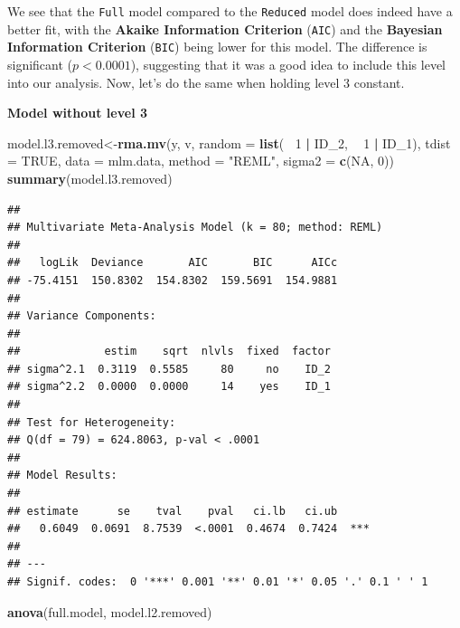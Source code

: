 \documentclass[]{book}
\newenvironment{Shaded}{\begin{snugshade}}{\end{snugshade}}
\newcommand{\DataTypeTok}[1]{\textcolor[rgb]{0.13,0.29,0.53}{#1}}
\newcommand{\DecValTok}[1]{\textcolor[rgb]{0.00,0.00,0.81}{#1}}
\newcommand{\KeywordTok}[1]{\textcolor[rgb]{0.13,0.29,0.53}{\textbf{#1}}}
\newcommand{\NormalTok}[1]{#1}
\newcommand{\OperatorTok}[1]{\textcolor[rgb]{0.81,0.36,0.00}{\textbf{#1}}}
\newcommand{\OtherTok}[1]{\textcolor[rgb]{0.56,0.35,0.01}{#1}}
\newcommand{\StringTok}[1]{\textcolor[rgb]{0.31,0.60,0.02}{#1}}
\begin{document}
We see that the \texttt{Full} model compared to the \texttt{Reduced} model does indeed have a better fit, with the \textbf{Akaike Information Criterion} (\texttt{AIC}) and the \textbf{Bayesian Information Criterion} (\texttt{BIC}) being lower for this model. The difference is significant (\(p<0.0001\)), suggesting that it was a good idea to include this level into our analysis. Now, let's do the same when holding level 3 constant.

\textbf{Model without level 3}

\begin{Shaded}
\begin{Highlighting}[]
\NormalTok{model.l3.removed<-}\KeywordTok{rma.mv}\NormalTok{(y, }
\NormalTok{                   v, }
                   \DataTypeTok{random =} \KeywordTok{list}\NormalTok{(}\OperatorTok{~}\StringTok{ }\DecValTok{1} \OperatorTok{|}\StringTok{ }\NormalTok{ID_}\DecValTok{2}\NormalTok{, }
                                 \OperatorTok{~}\StringTok{ }\DecValTok{1} \OperatorTok{|}\StringTok{ }\NormalTok{ID_}\DecValTok{1}\NormalTok{), }
                   \DataTypeTok{tdist =} \OtherTok{TRUE}\NormalTok{, }
                   \DataTypeTok{data =}\NormalTok{ mlm.data,}
                   \DataTypeTok{method =} \StringTok{"REML"}\NormalTok{,}
                   \DataTypeTok{sigma2 =} \KeywordTok{c}\NormalTok{(}\OtherTok{NA}\NormalTok{, }\DecValTok{0}\NormalTok{))}
\KeywordTok{summary}\NormalTok{(model.l3.removed)}
\end{Highlighting}
\end{Shaded}

\begin{verbatim}
## 
## Multivariate Meta-Analysis Model (k = 80; method: REML)
## 
##   logLik  Deviance       AIC       BIC      AICc  
## -75.4151  150.8302  154.8302  159.5691  154.9881  
## 
## Variance Components: 
## 
##             estim    sqrt  nlvls  fixed  factor
## sigma^2.1  0.3119  0.5585     80     no    ID_2
## sigma^2.2  0.0000  0.0000     14    yes    ID_1
## 
## Test for Heterogeneity: 
## Q(df = 79) = 624.8063, p-val < .0001
## 
## Model Results:
## 
## estimate      se    tval    pval   ci.lb   ci.ub     
##   0.6049  0.0691  8.7539  <.0001  0.4674  0.7424  ***
## 
## ---
## Signif. codes:  0 '***' 0.001 '**' 0.01 '*' 0.05 '.' 0.1 ' ' 1
\end{verbatim}

\begin{Shaded}
\begin{Highlighting}[]
\KeywordTok{anova}\NormalTok{(full.model, model.l2.removed)}
\end{Highlighting}
\end{Shaded}
\end{document}
